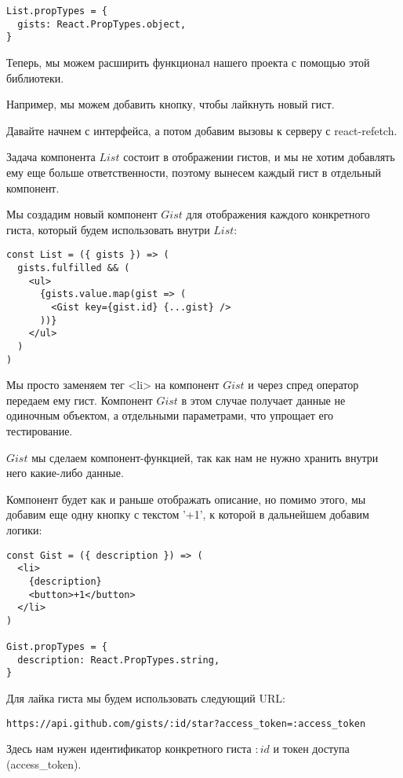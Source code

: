 \begin{lstlisting}
List.propTypes = {
  gists: React.PropTypes.object,
}
\end{lstlisting}

Теперь, мы можем расширить функционал нашего проекта с помощью этой библиотеки.

Например, мы можем добавить кнопку, чтобы лайкнуть новый гист.

Давайте начнем с интерфейса, а потом добавим вызовы к серверу с react-refetch.

Задача компонента $List$ состоит в отображении гистов, и мы не хотим добавлять ему еще больше ответственности, поэтому вынесем каждый гист в отдельный компонент.

Мы создадим новый компонент $Gist$ для отображения каждого конкретного гиста, который будем использовать внутри $List$:

\begin{lstlisting}
const List = ({ gists }) => (
  gists.fulfilled && (
    <ul>
      {gists.value.map(gist => (
        <Gist key={gist.id} {...gist} />
      ))}
    </ul>
  )
)
\end{lstlisting}

Мы просто заменяем тег <li> на компонент $Gist$ и через спред оператор передаем ему гист. Компонент $Gist$ в этом случае получает данные не одиночным объектом, а отдельными параметрами, что упрощает его тестирование.

$Gist$ мы сделаем компонент-функцией, так как нам не нужно хранить внутри него какие-либо данные.

Компонент будет как и раньше отображать описание, но помимо этого, мы добавим еще одну кнопку с текстом '+1', к которой в дальнейшем добавим логики:

\begin{lstlisting}
const Gist = ({ description }) => (
  <li>
    {description}
    <button>+1</button>
  </li>
)

Gist.propTypes = {
  description: React.PropTypes.string,
}
\end{lstlisting}

Для лайка гиста мы будем использовать следующий URL:

\begin{lstlisting}
https://api.github.com/gists/:id/star?access_token=:access_token
\end{lstlisting}

Здесь нам нужен идентификатор конкретного гиста $:id$ и токен доступа (access\_token).

